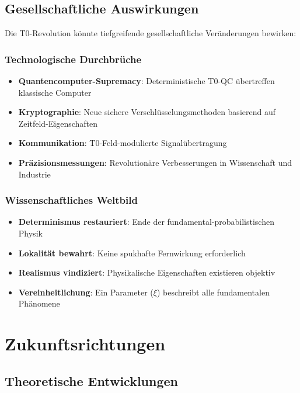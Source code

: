 \documentclass[12pt,a4paper]{article}
\begin{document}
	\subsection{Gesellschaftliche Auswirkungen}
	
	Die T0-Revolution könnte tiefgreifende gesellschaftliche Veränderungen bewirken:
	
	\subsubsection{Technologische Durchbrüche}
	
	\begin{itemize}
		\item \textbf{Quantencomputer-Supremacy}: Deterministische T0-QC übertreffen klassische Computer
		\item \textbf{Kryptographie}: Neue sichere Verschlüsselungsmethoden basierend auf Zeitfeld-Eigenschaften
		\item \textbf{Kommunikation}: T0-Feld-modulierte Signalübertragung
		\item \textbf{Präzisionsmessungen}: Revolutionäre Verbesserungen in Wissenschaft und Industrie
	\end{itemize}
	
	\subsubsection{Wissenschaftliches Weltbild}
	
	\begin{itemize}
		\item \textbf{Determinismus restauriert}: Ende der fundamental-probabilistischen Physik
		\item \textbf{Lokalität bewahrt}: Keine spukhafte Fernwirkung erforderlich
		\item \textbf{Realismus vindiziert}: Physikalische Eigenschaften existieren objektiv
		\item \textbf{Vereinheitlichung}: Ein Parameter ($\xi$) beschreibt alle fundamentalen Phänomene
	\end{itemize}
	
	\section{Zukunftsrichtungen}
	
	\subsection{Theoretische Entwicklungen}
	
\end{document}
